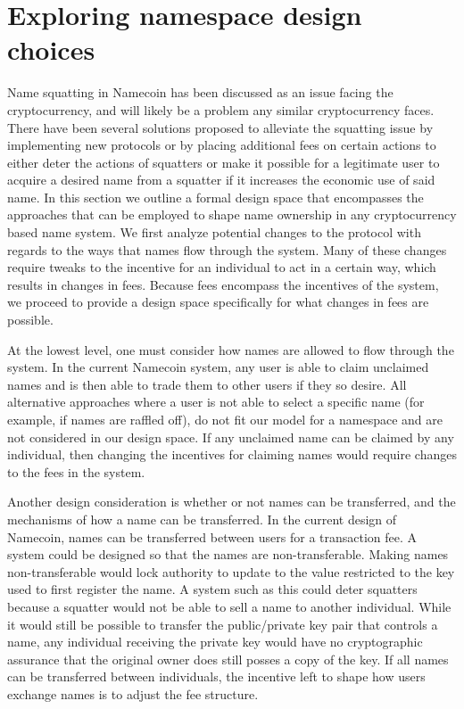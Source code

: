 \section{Exploring namespace design choices}
\label{sec:design}

    Name squatting in Namecoin has been discussed as an issue facing the cryptocurrency, and will likely be a problem any similar cryptocurrency faces. There have been several solutions proposed to alleviate the squatting issue by implementing new protocols or by placing additional fees on certain actions to either deter the actions of squatters or make it possible for a legitimate user to acquire a desired name from a squatter if it increases the economic use of said name. In this section we outline a formal design space that encompasses the approaches that can be employed to shape name ownership in any cryptocurrency based name system. We first analyze potential changes to the protocol with regards to the ways that names flow through the system. Many of these changes require tweaks to the incentive for an individual to act in a certain way, which results in changes in fees. Because fees encompass the incentives of the system, we proceed to provide a design space specifically for what changes in fees are possible.

    At the lowest level, one must consider how names are allowed to flow through the system. In the current Namecoin system, any user is able to claim unclaimed names and is then able to trade them to other users if they so desire. All alternative approaches where a user is not able to select a specific name (for example, if names are raffled off), do not fit our model for a namespace and are not considered in our design space. If any unclaimed name can be claimed by any individual, then changing the incentives for claiming names would require changes to the fees in the system.

    Another design consideration is whether or not names can be transferred, and the mechanisms of how a name can be transferred. In the current design of Namecoin, names can be transferred between users for a transaction fee. A system could be designed so that the names are non-transferable. Making names non-transferable would lock authority to update to the value restricted to the key used to first register the name. A system such as this could deter squatters because a squatter would not be able to sell a name to another individual. While it would still be possible to transfer the public/private key pair that controls a name, any individual receiving the private key would have no cryptographic assurance that the original owner does still posses a copy of the key. If all names can be transferred between individuals, the incentive left to shape how users exchange names is to adjust the fee structure. 

